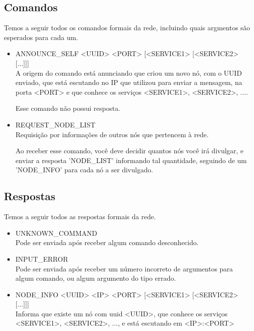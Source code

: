   \subsection{Comandos}
    Temos a seguir todos os comandos formais da rede, incluindo quais argmentos são esperados
    para cada um.
      
    \begin{itemize}
      \item ANNOUNCE\_SELF <UUID> <PORT> [<SERVICE1> [<SERVICE2> [...]]] \\
        A origem do comando está anunciando que criou um novo nó, com o UUID enviado, que está
        escutando no IP que utilizou para enviar a mensagem, na porta <PORT> e que conhece
        os serviços <SERVICE1>, <SERVICE2>, ....
        
        Esse comando não possui resposta.
    
      \item REQUEST\_NODE\_LIST \\
        Requisição por informações de outros nós que pertencem à rede.
        
        Ao receber esse comando, você deve decidir quantos nós você irá divulgar, e enviar a
        resposta 'NODE\_LIST' informando tal quantidade, seguindo de um 'NODE\_INFO' para cada
        nó a ser divulgado.
        
    \end{itemize}
  
  \subsection{Respostas}
    Temos a seguir todos as respostas formais da rede.
    
    \begin{itemize}
      \item UNKNOWN\_COMMAND \\
        Pode ser enviada após receber algum comando desconhecido.
        
      \item INPUT\_ERROR \\
        Pode ser enviada após receber um número incorreto de argumentos para algum comando, ou algum
        argumento do tipo errado.
    
      \item NODE\_INFO <UUID> <IP> <PORT> [<SERVICE1> [<SERVICE2> [...]]] \\
        Informa que existe um nó com uuid <UUID>, que conhece os serviços <SERVICE1>, <SERVICE2>, ...,
        e está escutando em <IP>:<PORT>
          
    \end{itemize}
  
